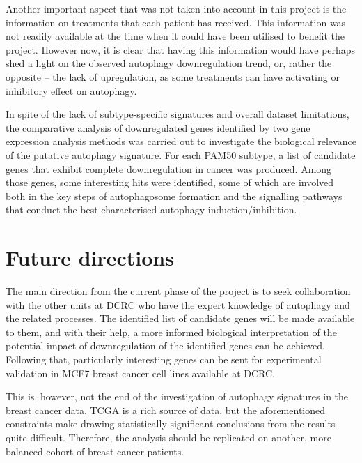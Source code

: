 \newpage
Another important aspect that was not taken into account in this project is the information on treatments that each patient has received. This information was not readily available at the time when it could have been utilised to benefit the project. However now, it is clear that having this information would have perhaps shed a light on the observed autophagy downregulation trend, or, rather the opposite -- the lack of upregulation, as some treatments can have activating or inhibitory effect on autophagy. 

In spite of the lack of subtype-specific signatures and overall dataset limitations, the comparative analysis of downregulated genes identified by two gene expression analysis methods was carried out to investigate the biological relevance of the putative autophagy signature. For each PAM50 subtype, a list of candidate genes that exhibit complete downregulation in cancer was produced. Among those genes, some interesting hits were identified, some of which are involved both in the key steps of autophagosome formation  and the signalling pathways that conduct the best-characterised autophagy induction/inhibition. 

\section{Future directions}

The main direction from the current phase of the project is to seek collaboration with the other units at DCRC who have the expert knowledge of autophagy and the related processes.  The identified list of candidate genes will be made available to them, and with their help, a more informed biological interpretation of the potential impact of downregulation of the identified genes can be achieved. Following that, particularly interesting genes can be sent for experimental validation in MCF7 breast cancer cell lines available at DCRC.

This is, however, not the end of the investigation of autophagy signatures in the breast cancer data. 
TCGA is a rich source of data, but the aforementioned constraints make drawing statistically significant conclusions from the results quite difficult. Therefore, the analysis should be  replicated on another, more balanced cohort of breast cancer patients. 

